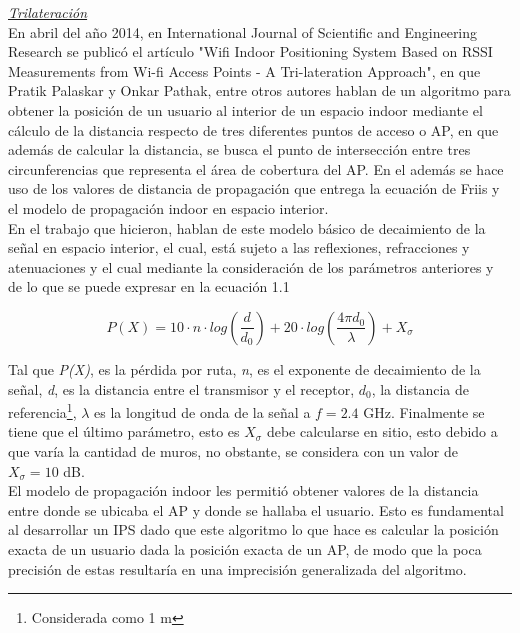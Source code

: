 \underline{\textit{Trilateración}}\\

En abril del año 2014, en International Journal of Scientific and Engineering Research se publicó el artículo "Wifi Indoor Positioning System Based on RSSI Measurements from Wi-fi Access Points - A Tri-lateration Approach", en que Pratik Palaskar y Onkar Pathak, entre otros autores hablan de un algoritmo para obtener la posición de un usuario al interior de un espacio indoor mediante el cálculo de la distancia respecto de tres diferentes puntos de acceso o \ac{AP}, en que además de calcular la distancia, se busca el punto de intersección entre tres circunferencias que representa el área de cobertura del AP. En el además se hace uso de los valores de distancia de propagación que entrega la ecuación de Friis y el modelo de propagación indoor en espacio interior.\\

En el trabajo que hicieron, hablan de este modelo básico de decaimiento de la señal en espacio interior, el cual, está sujeto a las reflexiones, refracciones y atenuaciones y el cual mediante la consideración de los parámetros anteriores y de lo que se puede expresar en la ecuación 1.1

\begin{equation}
P(X) = 10\cdot{n}\cdot{log\left({\dfrac{d}{d_0}}\right)} + 20\cdot{log\left({\dfrac{4\pi d_0}{\lambda}}\right)}  + X_{\sigma}
\end{equation}

Tal que \textit{P(X)}, es la pérdida por ruta, \textit{n}, es el exponente de decaimiento de la señal, \textit{d}, es la distancia entre el transmisor y el receptor, \textit{$d_0$}, la distancia de referencia\footnote{Considerada como 1 m}, \textit{$\lambda$} es la longitud de onda de la señal a $f = 2.4$ GHz. Finalmente se tiene que el  último parámetro, esto es \textit{$X_{\sigma}$} debe calcularse en sitio, esto debido a que varía la cantidad de muros, no obstante, se considera con un valor de $X_{\sigma} = 10$ dB.\\

El modelo de propagación indoor les permitió obtener valores de la distancia entre donde se ubicaba el AP y donde se hallaba el usuario. Esto es fundamental al desarrollar un \ac{IPS} dado que este algoritmo lo que hace es calcular la posición exacta de un usuario dada la posición exacta de un AP, de modo que la poca precisión de estas resultaría en una imprecisión generalizada del algoritmo. \\

